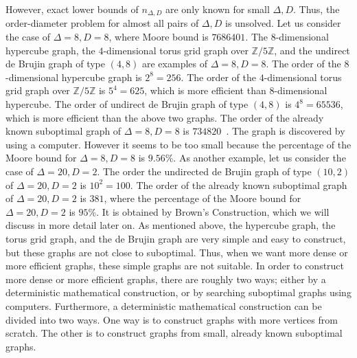 \documentclass[conference]{IEEEtran}
\newcommand{\Z}{\mathbb Z}
\begin{document}
However, exact lower bounds of $n_{\Delta, D}$ are only known for small $\Delta, D$.
Thus, the order-diameter problem for almost all pairs of $\Delta, D$ is unsolved.
Let us consider the case of $\Delta=8, D=8$, where Moore bound is $7686401$.
The $8$-dimensional hypercube graph, the $4$-dimensional torus grid graph over $\Z/5\Z$,
and the undirect de Brujin graph of type $(4,8)$ are examples of $\Delta=8,D=8$.
The order of the $8$-dimensional hypercube graph is $2^8=256$.
The order of the $4$-dimensional torus grid graph over $\Z/5\Z$ is $5^4=625$, 
which is more efficient than $8$-dimensional hypercube.
The order of undirect de Brujin graph of type $(4,8)$ is $4^8=65536$,
which is more efficient than the above two graphs.
The order of the already known suboptimal graph of $\Delta=8, D=8$ is $734820$~\cite{Loz08newrecord}.
The graph is discovered by using a computer.
However it seems to be too small because the percentage of the Moore bound for $\Delta=8, D=8$ is $9.56$\%.
As another example, let us consider the case of $\Delta=20, D=2$.
The order the undirected de Brujin graph of type $(10, 2)$ of $\Delta=20, D=2$ is $10^2=100$.
The order of the already known suboptimal graph  of $\Delta=20, D=2$ is $381$,
where the percentage of the Moore bound for $\Delta=20, D=2$ is $95$\%.
It is obtained by Brown's Construction, which we will discuss in more detail later on.
As mentioned above, the hypercube graph, the torus grid graph, and the de Brujin graph are very simple and easy to construct,
but these graphs are not close to suboptimal.
Thus, when we want more dense or more efficient graphs, these simple graphs are not suitable.
In order to construct more dense or more efficient graphs, there are roughly two ways;
either by a deterministic mathematical construction, or by searching suboptimal graphs using computers.
Furthermore, a deterministic mathematical construction can be divided into two ways.
One way is to construct graphs with more vertices from scratch.
The other is to construct graphs from small, already known suboptimal graphs.
\end{document}

